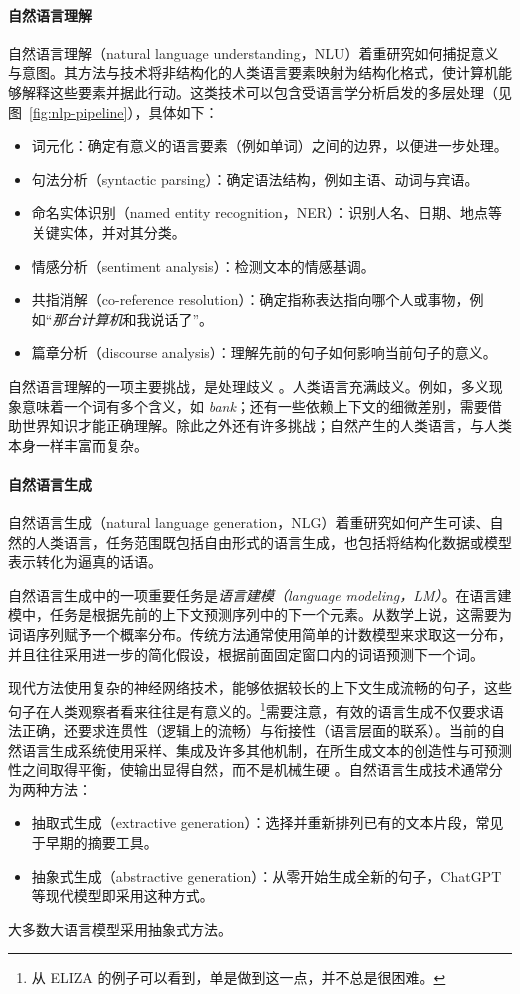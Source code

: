 \paragraph{自然语言理解}
自然语言理解（natural language understanding，NLU）着重研究如何捕捉意义与意图。其方法与技术将非结构化的人类语言要素映射为结构化格式，使计算机能够解释这些要素并据此行动。这类技术可以包含受语言学分析启发的多层处理（见图~\ref{fig:nlp-pipeline}），具体如下：
\begin{itemize}
    \item 词元化：确定有意义的语言要素（例如单词）之间的边界，以便进一步处理。
    \item 句法分析（syntactic parsing）：确定语法结构，例如主语、动词与宾语。
    \item 命名实体识别（named entity recognition，NER）：识别人名、日期、地点等关键实体，并对其分类。
    \item 情感分析（sentiment analysis）：检测文本的情感基调。
    \item 共指消解（co-reference resolution）：确定指称表达指向哪个人或事物，例如“{\em 那台计算机}和我说话了”。
    \item 篇章分析（discourse analysis）：理解先前的句子如何影响当前句子的意义。
\end{itemize}
自然语言理解的一项主要挑战，是处理歧义 \citep{DBLP:conf/aaai/Roth98, liu-etal-2023-afraid}。人类语言充满歧义。例如，多义现象意味着一个词有多个含义，如 {\em bank}；还有一些依赖上下文的细微差别，需要借助世界知识才能正确理解。除此之外还有许多挑战；自然产生的人类语言，与人类本身一样丰富而复杂。

\paragraph{自然语言生成}
自然语言生成（natural language generation，NLG）着重研究如何产生可读、自然的人类语言，任务范围既包括自由形式的语言生成，也包括将结构化数据或模型表示转化为逼真的话语。

自然语言生成中的一项重要任务是\emph{语言建模（language modeling，LM）}。在语言建模中，任务是根据先前的上下文预测序列中的下一个元素。从数学上说，这需要为词语序列赋予一个概率分布。传统方法通常使用简单的计数模型来求取这一分布，并且往往采用进一步的简化假设，根据前面固定窗口内的词语预测下一个词。

现代方法使用复杂的神经网络技术，能够依据较长的上下文生成流畅的句子，这些句子在人类观察者看来往往是有意义的。\footnote{从 ELIZA 的例子可以看到，单是做到这一点，并不总是很困难。}需要注意，有效的语言生成不仅要求语法正确，还要求连贯性（逻辑上的流畅）与衔接性（语言层面的联系）。当前的自然语言生成系统使用采样、集成及许多其他机制，在所生成文本的创造性与可预测性之间取得平衡，使输出显得自然，而不是机械生硬 \citep{li-jurafsky-2017-neural, 10.1145/3554727, gatt2018survey}。自然语言生成技术通常分为两种方法：
\begin{itemize}
    \item 抽取式生成（extractive generation）：选择并重新排列已有的文本片段，常见于早期的摘要工具。
    \item 抽象式生成（abstractive generation）：从零开始生成全新的句子，ChatGPT 等现代模型即采用这种方式。
\end{itemize}
大多数大语言模型采用抽象式方法。

